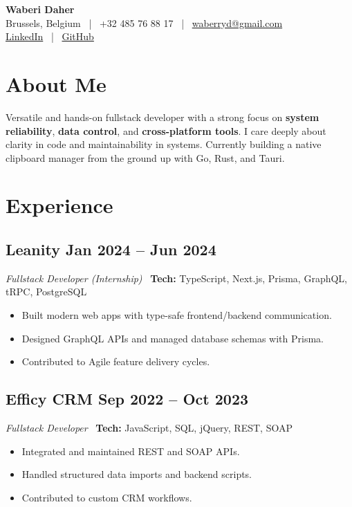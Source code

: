 \documentclass[11pt,a4paper]{article}
\begin{document}
\begin{center}
    {\LARGE \textbf{Waberi Daher}} \\[4pt]
    Brussels, Belgium ~|~ +32 485 76 88 17 ~|~ \href{mailto:waberryd@gmail.com}{waberryd@gmail.com} \\[2pt]
    \href{https://www.linkedin.com/in/waberi-daher}{LinkedIn} ~|~ \href{https://github.com/berrythewa}{GitHub}
\end{center}

\section*{About Me}
Versatile and hands-on fullstack developer with a strong focus on \textbf{system reliability}, \textbf{data control}, and \textbf{cross-platform tools}. I care deeply about clarity in code and maintainability in systems. Currently building a native clipboard manager from the ground up with Go, Rust, and Tauri.

\section*{Experience}
\subsection{Leanity \hfill Jan 2024 -- Jun 2024}
\textit{Fullstack Developer (Internship)} \
\textbf{Tech:} TypeScript, Next.js, Prisma, GraphQL, tRPC, PostgreSQL
\begin{itemize}[leftmargin=*]
    \item Built modern web apps with type-safe frontend/backend communication.
    \item Designed GraphQL APIs and managed database schemas with Prisma.
    \item Contributed to Agile feature delivery cycles.
\end{itemize}

\subsection{Efficy CRM \hfill Sep 2022 -- Oct 2023}
\textit{Fullstack Developer} \
\textbf{Tech:} JavaScript, SQL, jQuery, REST, SOAP
\begin{itemize}[leftmargin=*]
    \item Integrated and maintained REST and SOAP APIs.
    \item Handled structured data imports and backend scripts.
    \item Contributed to custom CRM workflows.
\end{itemize}
\end{document}

